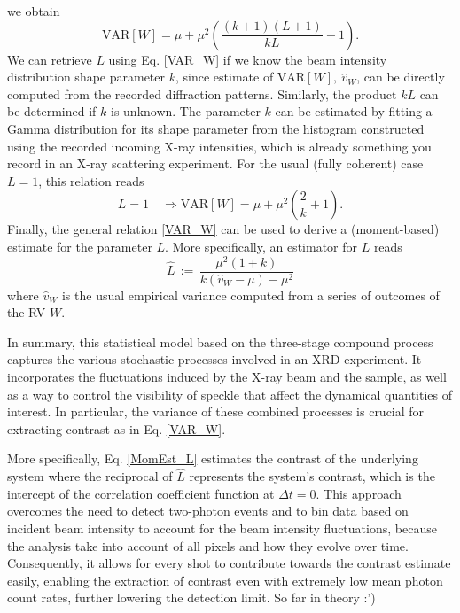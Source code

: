 \documentclass[11pt]{article}
\theoremstyle{definition}
\begin{document}
%
we obtain
%
\begin{equation}
\text{VAR}[W] = \mu + \mu^2 \left( \frac{(k+1)(L+1)}{kL} - 1\right).
\label{VAR_W}
\end{equation}
We can retrieve \(L\) using Eq. \eqref{VAR_W} if we know the beam intensity distribution shape parameter \(k\), since estimate of \(\text{VAR}[W], ~\widehat{v}_W\), can be directly computed from the recorded diffraction patterns. Similarly, the product \(kL\) can be determined if \(k\) is unknown. The parameter \(k\) can be estimated by fitting a Gamma distribution for its shape parameter from the histogram constructed using the recorded incoming X-ray intensities, which is already something you record in an X-ray scattering experiment.  
%
For the usual (fully coherent) case $L=1$, this relation reads 
%
\begin{equation}
L=1 \quad \Rightarrow \text{VAR}[W] = \mu + \mu^2 \left( \frac{2}{k} + 1\right).
\label{VAR_W__}
\end{equation}
%
Finally, the general relation \eqref{VAR_W} can be used to derive a (moment-based) estimate for the parameter $L$. More specifically, an estimator for $L$ reads    
%
\begin{equation}
\widehat{L} \, := \, \frac{\mu^2(1 + k)}{k(\widehat{v}_W - \mu)- \mu^2}
\label{MomEst_L}
\end{equation}
%
where $\widehat{v}_W$ is the usual empirical variance computed from a series of outcomes of the RV $W$. 
 
In summary, this statistical model based on the three-stage compound process captures the various stochastic processes involved in an XRD experiment. It incorporates the fluctuations induced by the X-ray beam and the sample, as well as a way to control the visibility of speckle that affect the dynamical quantities of interest. In particular, the variance of these combined processes is crucial for extracting contrast as in Eq. \eqref{VAR_W}.

More specifically, Eq. \eqref{MomEst_L} estimates the contrast of the underlying system where the reciprocal of \(\widehat{L}\) represents the system's contrast, which is the intercept of the correlation coefficient function at \(\Delta t = 0\). This approach overcomes the need to detect two-photon events and to bin data based on incident beam intensity to account for the beam intensity fluctuations, because the analysis take into account of all pixels and how they evolve over time. Consequently, it allows for every shot to contribute towards the contrast estimate easily, enabling the extraction of contrast even with extremely low mean photon count rates, further lowering the detection limit. So far in theory :')
\end{document}

